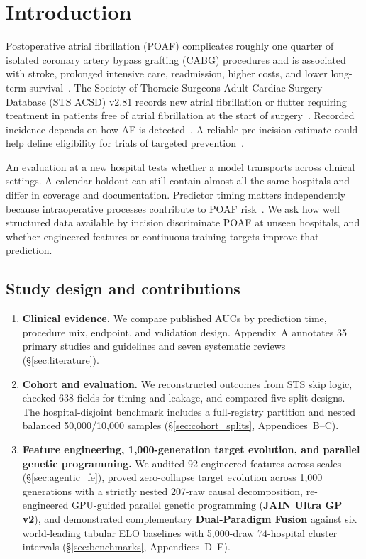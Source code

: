 \section{Introduction}
\label{sec:intro}

Postoperative atrial fibrillation (POAF) complicates roughly one quarter of isolated coronary artery bypass grafting (CABG) procedures and is associated with stroke, prolonged intensive care, readmission, higher costs, and lower long-term survival~\cite{aranki1996predictors,almassi1997,villareal2004,filardo2009survival,elchami2010poaf,lapar2014poaf,dobrev2019postoperative,jawitz2020poaf,caldonazo2023meta,gaudino2023ehj}. The Society of Thoracic Surgeons Adult Cardiac Surgery Database (STS ACSD) v2.81 records new atrial fibrillation or flutter requiring treatment in patients free of atrial fibrillation at the start of surgery~\cite{sts2014v281,shahian2018sts,obrien2018sts2}. Recorded incidence depends on how AF is detected~\cite{filardo2017telemetry,filardo2020telemetry,perezgrovas2023jaha}. A reliable pre-incision estimate could help define eligibility for trials of targeted prevention~\cite{gaudino2021palacs,chatterjee2026sts}.

An evaluation at a new hospital tests whether a model transports across clinical settings. A calendar holdout can still contain almost all the same hospitals and differ in coverage and documentation. Predictor timing matters independently because intraoperative processes contribute to POAF risk~\cite{echahidi2008mechanisms,dobrev2019postoperative}. We ask how well structured data available by incision discriminate POAF at unseen hospitals, and whether engineered features or continuous training targets improve that prediction.

\subsection{Study design and contributions}
\begin{enumerate}
  \item \textbf{Clinical evidence.} We compare published AUCs by prediction time, procedure mix, endpoint, and validation design. Appendix~A annotates 35 primary studies and guidelines and seven systematic reviews (\S\ref{sec:literature}).
  \item \textbf{Cohort and evaluation.} We reconstructed outcomes from STS skip logic, checked 638 fields for timing and leakage, and compared five split designs. The hospital-disjoint benchmark includes a full-registry partition and nested balanced 50,000/10,000 samples (\S\ref{sec:cohort_splits}, Appendices~B--C).
  \item \textbf{Feature engineering, 1,000-generation target evolution, and parallel genetic programming.} We audited 92 engineered features across scales (\S\ref{sec:agentic_fe}), proved zero-collapse target evolution across 1,000 generations with a strictly nested 207-raw causal decomposition, re-engineered GPU-guided parallel genetic programming (\textbf{JAIN Ultra GP v2}), and demonstrated complementary \textbf{Dual-Paradigm Fusion} against six world-leading tabular ELO baselines with 5,000-draw 74-hospital cluster intervals (\S\ref{sec:benchmarks}, Appendices~D--E).
\end{enumerate}
